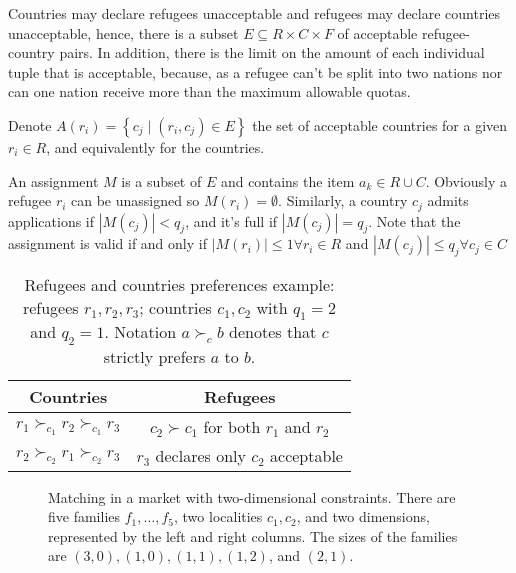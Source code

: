 Countries may declare refugees unacceptable and refugees may declare countries unacceptable, hence, there is a subset \(E \subseteq R \times C \times F\) of acceptable refugee-country pairs.
In addition, there is the limit on the amount of each individual tuple that is acceptable, because, as a refugee can't be split into two nations nor can one nation receive more than the maximum allowable quotas.

Denote \(A \left( r_i \right) = \left\{ c_j \mid \left( r_i, c_j \right) \in E \right\}\) the set of acceptable countries for a given \(r_i \in R\), and equivalently for the countries.

An assignment \(M\) is a subset of \(E\) and contains the item \(a_k \in R \cup C\).
Obviously a refugee \(r_i\) can be unassigned so \(M \left( r_i \right) = \emptyset\).
Similarly, a country \(c_j\) admits applications if \(\left| M \left( c_j \right) \right| < q_j\), and it's full if \(\left| M \left( c_j \right) \right| = q_j\).
Note that the assignment is valid if and only if \(\left| M \left( r_i \right) \right| \leq 1 \forall r_i \in R\) and \(\left| M \left( c_j \right) \right| \leq q_j \forall c_j \in C\)

\begin{table}[!htb]
    \centering
    \begin{tabular}{c|c}
        \hline Countries & Refugees \\
        \hline \(r_1 \succ_{c_1} r_2 \succ_{c_1} r_3\) & \(c_2 \succ c_1\) for both \(r_1\) and \(r_2\) \\
        \(r_2 \succ_{c_2} r_1 \succ_{c_2} r_3\) & \(r_3\) declares only \(c_2\) acceptable \\
        \hline
    \end{tabular}
    \caption{Refugees and countries preferences example: refugees \(r_1, r_2, r_3\); countries \(c_1, c_2\) with \(q_1 = 2\) and \(q_2 = 1\). Notation \(a \succ_c b\) denotes that \(c\) strictly prefers \(a\) to \(b\).}
    \label{tab:countries-refugees}
\end{table}

\begin{figure}[!htb]  %
    \def\svgwidth{\columnwidth}
    
    \caption{Matching in a market with two-dimensional constraints. There are five families
        \(f_1, \dots, f_5\), two localities \(c_1, c_2\), and two dimensions, represented by the left and right columns.
        The sizes of the families are \((3, 0), (1, 0), (1, 1), (1, 2)\), and \((2, 1)\).}
    \label{fig:complete_matching}
\end{figure}